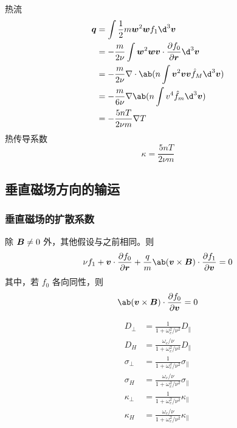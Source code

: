 热流
\begin{equation}\begin{aligned}
\vector{q} &= \int \frac{1}{2} m \vector{w}^2 \vector{w} f_1 \d^3\vector{v} \\
&= - \frac{m}{2 \nu} \int \vector{w}^2 \vector{w}
    \vector{v} \cdot \pdv{f_0}{\vector{r}} \d^3\vector{v} \\
&= - \frac{m}{2 \nu} \dive{\ab(n \int \vector{v}^2 \vector{v}
    \vector{v} \hat{f}_M \d^3\vector{v})} \\
&= - \frac{m}{6 \nu} \grad{\ab(n \int v^4 \hat{f}_m \d^3\vector{v})} \\
&= - \frac{5 n T}{2 \nu m} \grad{T}
\end{aligned}\end{equation}
热传导系数
\begin{equation}
\kappa = \frac{5 n T}{2 \nu m}
\end{equation}

\subsection{垂直磁场方向的输运}

\subsubsection{垂直磁场的扩散系数}

除 $\bm{B} \neq 0$ 外，其他假设与之前相同。则
\begin{equation}
\nu f_1 + \vector{v} \cdot \pdv{f_0}{\vector{r}}
+ \frac{q}{m} \ab(\vector{v} \times \vector{B}) \cdot \pdv{f_1}{\vector{v}}
= 0
\end{equation}
其中，若 $f_0$ 各向同性，则
\begin{equation}
\ab(\vector{v} \times \vector{B}) \cdot \pdv{f_0}{\vector{v}} = 0
\end{equation}

\begin{subequations}\begin{align}
D_\perp &= \frac{1}{1 + \omega_c^2 / \nu^2} D_\parallel \\
D_H &= \frac{\omega_c / \nu}{1 + \omega_c^2 / \nu^2} D_\parallel \\
\sigma_\perp &= \frac{1}{1 + \omega_c^2 / \nu^2} \sigma_\parallel \\
\sigma_H &= \frac{\omega_c / \nu}{1 + \omega_c^2 / \nu^2} \sigma_\parallel \\
\kappa_\perp &= \frac{1}{1 + \omega_c^2 / \nu^2} \kappa_\parallel \\
\kappa_H &= \frac{\omega_c / \nu}{1 + \omega_c^2 / \nu^2} \kappa_\parallel
\end{align}\end{subequations}
